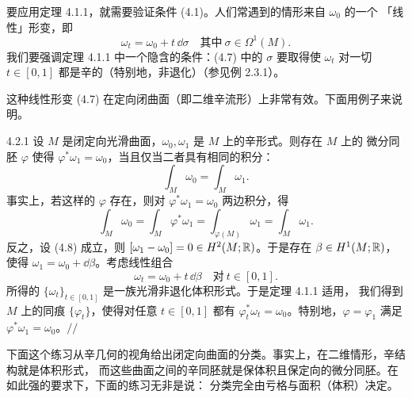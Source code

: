 要应用定理 4.1.1，就需要验证条件 (4.1)。人们常遇到的情形来自 $\omega_0$ 的一个
「线性」形变，即
\begin{equation}\tag{4.7}
  \omega_t=\omega_0+t\,\dd\sigma
  \quad\text{其中}\ \sigma\in\Omega^1(M).
\end{equation}
我们要强调定理 4.1.1 中一个隐含的条件：(4.7) 中的 $\sigma$ 要取得使 $\omega_t$ 对一切
$t\in[0,1]$ 都是辛的（特别地，非退化）（参见例 2.3.1）。

这种线性形变 (4.7) 在定向闭曲面（即二维辛流形）上非常有效。下面用例子来说明。

\begin{wexam}{4.2.1}
  设 $M$ 是闭定向光滑曲面，$\omega_0,\omega_1$ 是 $M$ 上的辛形式。则存在 $M$ 上的
  微分同胚 $\varphi$ 使得 $\varphi^*\omega_1=\omega_0$，当且仅当二者具有相同的积分：
  \begin{equation}\tag{4.8}
    \int_M\omega_0=\int_M\omega_1.
  \end{equation}
  事实上，若这样的 $\varphi$ 存在，则对 $\varphi^*\omega_1=\omega_0$ 两边积分，得
  \begin{equation*}
    \int_M\omega_0=\int_M\varphi^*\omega_1=\int_{\varphi(M)}\omega_1=\int_M\omega_1.
  \end{equation*}
  反之，设 (4.8) 成立，则 $[\omega_1-\omega_0]=0\in H^2(M;\mathbb{R})$。于是存在
  $\beta\in H^1(M;\mathbb{R})$，使得 $\omega_1=\omega_0+\dd\beta$。考虑线性组合
  \begin{equation*}
    \omega_t=\omega_0+t\,\dd\beta\quad\text{对}\ t\in[0,1].
  \end{equation*}
  所得的 $\{\omega_t\}_{t\in[0,1]}$ 是一族光滑非退化体积形式。于是定理 4.1.1 适用，
  我们得到 $M$ 上的同痕 $\{\varphi_t\}$，使得对任意 $t\in[0,1]$ 都有
  $\varphi_t^*\omega_t=\omega_0$。特别地，$\varphi=\varphi_1$ 满足
  $\varphi^*\omega_1=\omega_0$。\hfill$//$
\end{wexam}

下面这个练习从辛几何的视角给出闭定向曲面的分类。事实上，在二维情形，辛结构就是体积形式，
而这些曲面之间的辛同胚就是保体积且保定向的微分同胚。在如此强的要求下，下面的练习无非是说：
分类完全由亏格与面积（体积）决定。


